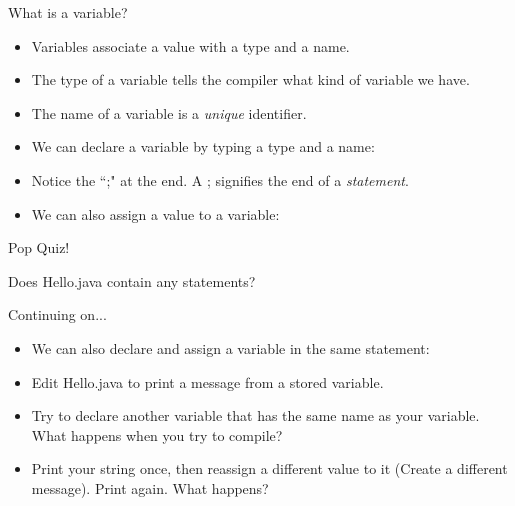 \begin{frame}[fragile]{What is a variable?}
\begin{itemize}
\item Variables associate a value with a type and a name.\pause
\item The type of a variable tells the compiler what kind of variable we have. \pause
\item The name of a variable is a \emph{unique} identifier. \pause
\item We can declare a variable by typing a type and a name:
\begin{center}
\begin{semiverbatim}\end{semiverbatim}
\end{center}
\item Notice the ``;" at the end. A ; signifies the end of a \emph{statement}.
\item We can also assign a value to a variable:
\begin{center}
\begin{semiverbatim}\end{semiverbatim}
\end{center}
\end{itemize}
\end{frame}

\begin{frame}{Pop Quiz!}
\begin{center}
Does Hello.java contain any statements?
\end{center}
\end{frame}


\begin{frame}[fragile]{Continuing on...}
\begin{itemize}
\item We can also declare and assign a variable in the same statement:
\begin{center}
\begin{semiverbatim}\end{semiverbatim}
\end{center} \pause
\item Edit Hello.java to print a message from a stored variable.
\begin{semiverbatim}\end{semiverbatim}
\item Try to declare another variable that has the same name as your variable. What happens when you try to compile?
\item Print your string once, then reassign a different value to it (Create a different message). Print again. What happens?
\end{itemize}
\end{frame}


